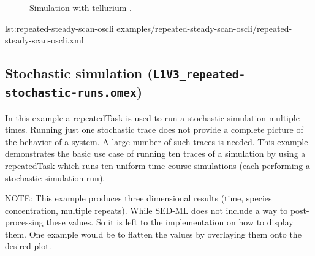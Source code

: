 \begin{figure}[ht!]
\begin{minipage}{0.47\textwidth}
        \caption{Simulation with tellurium \citep{tellurium}.}
    \end{minipage}
    \label{fig:repeated-steady-scan-oscli}
\end{figure}

{lst:repeated-steady-scan-oscli}
{examples/repeated-steady-scan-oscli/repeated-steady-scan-oscli.xml}


\subsection{Stochastic simulation (\texttt{L1V3\_repeated-stochastic-runs.omex})}
In this example a \hyperref[class:repeatedTask]{repeatedTask} is used to run a stochastic simulation multiple times.
Running just one stochastic trace does not provide a complete picture of the behavior of a system. A large number of such traces is needed. This example demonstrates the basic use case of running ten traces of a simulation by using a \hyperref[class:repeatedTask]{repeatedTask} which runs ten uniform time course simulations (each performing a stochastic simulation run).

NOTE: This example produces three dimensional results (time, species concentration, multiple repeats). While SED-ML \currentLV does not include a way to post-processing these values. So it is left to the implementation on how to display them. One example would be to flatten the values by overlaying them onto the desired plot. 

